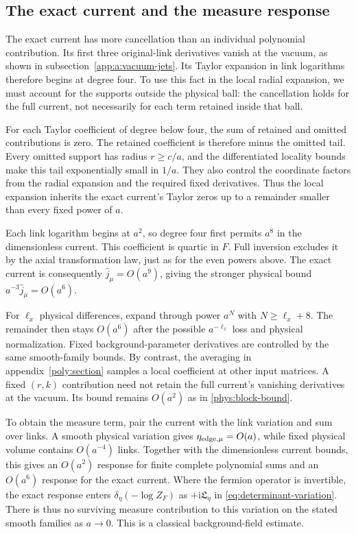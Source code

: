\documentclass[11pt,a4paper]{article}
\theoremstyle{remark}
\newcommand{\ii}{\mathrm i}
\begin{document}
\subsection{The exact current and the measure response}

The exact current has more cancellation than an individual polynomial
contribution. Its first three original-link derivatives vanish at the
vacuum, as shown in subsection~\ref{app:a:vacuum-jets}. Its Taylor
expansion in link logarithms therefore begins at degree four. To use
this fact in the local radial expansion, we must account for the
supports outside the physical ball: the cancellation holds for the
full current, not necessarily for each term retained inside that ball.

For each Taylor coefficient of degree below four, the sum of retained
and omitted contributions is zero. The retained coefficient is
therefore minus the omitted tail. Every omitted support has radius
$r\ge c/a$, and the differentiated locality bounds make this tail
exponentially small in $1/a$. They also control the coordinate factors
from the radial expansion and the required fixed derivatives. Thus the
local expansion inherits the exact current's Taylor zeros up to a
remainder smaller than every fixed power of $a$.

Each link logarithm begins at $a^2$, so degree four first permits
$a^8$ in the dimensionless current. This coefficient is quartic in
$F$. Full inversion excludes it by the axial transformation law, just
as for the even powers above. The exact current is consequently
$\widehat j_\mu=O(a^9)$, giving the stronger physical bound
$a^{-3}\widehat j_\mu=O(a^6)$.

For $\ell_x$ physical differences, expand through power $a^N$
with $N\ge\ell_x+8$. The remainder then stays $O(a^6)$ after the
possible $a^{-\ell_x}$ loss and physical normalization. Fixed
background-parameter derivatives are controlled by the same
smooth-family bounds. By contrast, the averaging in
appendix~\ref{poly:section} samples a local coefficient at other input
matrices. A fixed $(r,k)$ contribution need not retain the full
current's vanishing derivatives at the vacuum. Its bound remains
$O(a^2)$ as in \eqref{phys:block-bound}.

To obtain the measure term, pair the current with the link variation
and sum over links. A smooth physical variation gives
$\eta_{{\rm edge},\mu}=O(a)$, while fixed physical volume contains
$O(a^{-4})$ links. Together with the dimensionless current bounds,
this gives an $O(a^2)$ response for finite complete polynomial sums
and an $O(a^6)$ response for the exact current. Where the fermion
operator is invertible, the exact response enters
$\delta_\eta(-\log Z_F)$ as $+\ii\mathfrak L_\eta$ in
\eqref{eq:determinant-variation}. There is thus no surviving measure
contribution to this variation on the stated smooth families as
$a\to0$. This is a classical background-field estimate.
\end{document}
